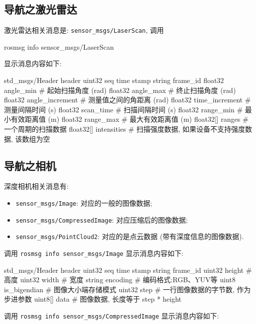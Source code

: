 \documentclass[openany, fontset=windowsold]{ctexbook}
\theoremstyle{kaiti}
\theoremstyle{normal}
\begin{document}
\subsection{导航之激光雷达}

激光雷达相关消息是: \verb|sensor_msgs/LaserScan|, 调用 

\begin{bash}
  rosmsg info sensor_msgs/LaserScan
\end{bash}

显示消息内容如下:

\begin{bash}
  std_msgs/Header header
    uint32 seq
    time stamp
    string frame_id
  float32 angle_min # 起始扫描角度 (rad)
  float32 angle_max # 终止扫描角度 (rad)
  float32 angle_increment # 测量值之间的角距离 (rad)
  float32 time_increment # 测量间隔时间 (s)
  float32 scan_time # 扫描间隔时间 (s)
  float32 range_min # 最小有效距离值 (m)
  float32 range_max # 最大有效距离值 (m)
  float32[] ranges # 一个周期的扫描数据
  float32[] intensities # 扫描强度数据, 如果设备不支持强度数据, 该数组为空
\end{bash}

\subsection{导航之相机}

深度相机相关消息有:

\begin{itemize}
  \item \verb|sensor_msgs/Image|: 对应的一般的图像数据;
  \item \verb|sensor_msgs/CompressedImage|: 对应压缩后的图像数据;
  \item \verb|sensor_msgs/PointCloud2|: 对应的是点云数据 (带有深度信息的图像数据).
\end{itemize}

调用 \verb|rosmsg info sensor_msgs/Image| 显示消息内容如下:

\begin{bash}
  std_msgs/Header header
    uint32 seq
    time stamp
    string frame_id
  uint32 height # 高度
  uint32 width  # 宽度
  string encoding # 编码格式:RGB、YUV等
  uint8 is_bigendian # 图像大小端存储模式
  uint32 step # 一行图像数据的字节数, 作为步进参数
  uint8[] data # 图像数据, 长度等于 step * height
\end{bash}

调用 \verb|rosmsg info sensor_msgs/CompressedImage| 显示消息内容如下:
\end{document}
